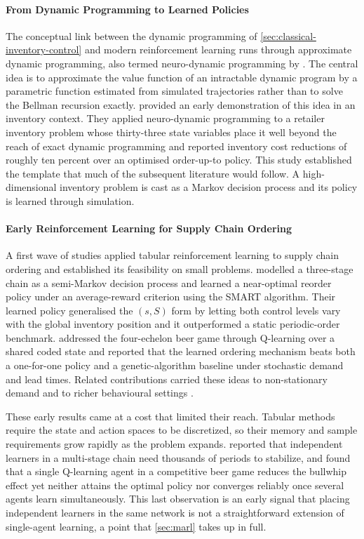 \paragraph{\textbf{From Dynamic Programming to Learned Policies}}
The conceptual link between the dynamic programming of \autoref{sec:classical-inventory-control} and modern reinforcement learning runs through approximate dynamic programming, also termed neuro-dynamic programming by \citet{bertsekas1996ndp}. The central idea is to approximate the value function of an intractable dynamic program by a parametric function estimated from simulated trajectories rather than to solve the Bellman recursion exactly. \citet{vanroy1997ndp} provided an early demonstration of this idea in an inventory context. They applied neuro-dynamic programming to a retailer inventory problem whose thirty-three state variables place it well beyond the reach of exact dynamic programming and reported inventory cost reductions of roughly ten percent over an optimised order-up-to policy. This study established the template that much of the subsequent literature would follow. A high-dimensional inventory problem is cast as a Markov decision process and its policy is learned through simulation.

\paragraph{\textbf{Early Reinforcement Learning for Supply Chain Ordering}}
A first wave of studies applied tabular reinforcement learning to supply chain ordering and established its feasibility on small problems. \citet{giannoccaro2002rl} modelled a three-stage chain as a semi-Markov decision process and learned a near-optimal reorder policy under an average-reward criterion using the SMART algorithm. Their learned policy generalised the $(s, S)$ form by letting both control levels vary with the global inventory position and it outperformed a static periodic-order benchmark. \citet{chaharsooghi2008beergame} addressed the four-echelon beer game through Q-learning over a shared coded state and reported that the learned ordering mechanism beats both a one-for-one policy and a genetic-algorithm baseline under stochastic demand and lead times. Related contributions carried these ideas to non-stationary demand and to richer behavioural settings \citep[e.g.,][]{mortazavi2015selfadaptive, valluri2009rl}.

These early results came at a cost that limited their reach. Tabular methods require the state and action spaces to be discretized, so their memory and sample requirements grow rapidly as the problem expands. \citet{valluri2009rl} reported that independent learners in a multi-stage chain need thousands of periods to stabilize, and \citet{vantongeren2007qlearning} found that a single Q-learning agent in a competitive beer game reduces the bullwhip effect yet neither attains the optimal policy nor converges reliably once several agents learn simultaneously. This last observation is an early signal that placing independent learners in the same network is not a straightforward extension of single-agent learning, a point that \autoref{sec:marl} takes up in full.

